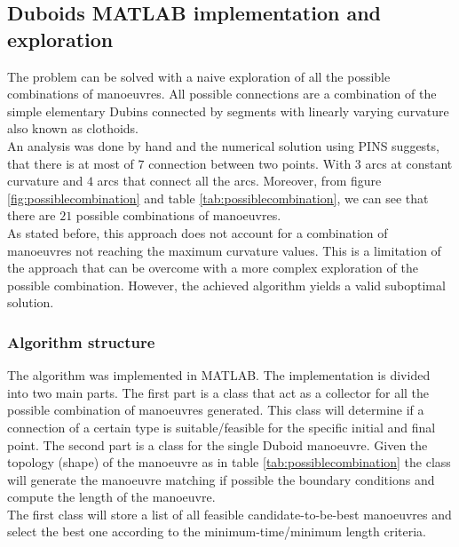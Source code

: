 \documentclass[11pt,twocolumn]{scrartcl}
\begin{document}
\subsection*{Duboids MATLAB implementation and exploration}
%
The problem can be solved with a naive exploration of all the possible combinations of manoeuvres. All possible connections are a combination of the simple elementary Dubins connected by segments with linearly varying curvature also known as clothoids.\cite{bertolazzi2015g1}\\
An analysis was done by hand and the numerical solution using PINS suggests, that there is at most of $7$ connection between two points. With $3$ arcs at constant curvature and $4$ arcs that connect all the arcs. Moreover, from figure \ref{fig:possiblecombination} and table \ref{tab:possiblecombination}, we can see that there are $21$ possible combinations of manoeuvres.\\
As stated before, this approach does not account for a combination of manoeuvres not reaching the maximum curvature values. This is a limitation of the approach that can be overcome with a more complex exploration of the possible combination. However, the achieved algorithm yields a valid suboptimal solution.
%
\subsubsection*{Algorithm structure}
%
The algorithm was implemented in MATLAB. The implementation is divided into two main parts. The first part is a class that act as a collector for all the possible combination of manoeuvres generated. This class will determine if a connection of a certain type is suitable/feasible for the specific initial and final point. The second part is a class for the single Duboid manoeuvre. Given the topology (shape) of the manoeuvre as in table \ref{tab:possiblecombination} the class will generate the manoeuvre matching if possible the boundary conditions and compute the length of the manoeuvre.\\
The first class will store a list of all feasible candidate-to-be-best manoeuvres and select the best one according to the minimum-time/minimum length criteria.
%
\end{document}
